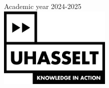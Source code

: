 \documentclass[openany]{book}
\begin{document}
\begin{titlepage}

{\large Academic year 2024-2025}\\[2cm]


\includegraphics[width=0.4\textwidth]{images/uhasselt.jpg}\\
 

\vfill %

\end{titlepage}
\end{document}
